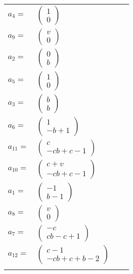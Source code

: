 \documentclass[1p]{elsarticle_modified}
\theoremstyle{definition}
\begin{document}
\begin{tabular}{m{7pt} m{180pt} m{7pt} m{180pt} }
\flushright $a_{4}=$&$\begin{pmatrix}1\\0\end{pmatrix}$ \\
\flushright $a_{9}=$&$\begin{pmatrix}v\\0\end{pmatrix}$ \\
\flushright $a_{2}=$&$\begin{pmatrix}0\\b\end{pmatrix}$ \\
\flushright $a_{5}=$&$\begin{pmatrix}1\\0\end{pmatrix}$ \\
\flushright $a_{3}=$&$\begin{pmatrix}b\\b\end{pmatrix}$ \\
\flushright $a_{6}=$&$\begin{pmatrix}1\\- b+1\end{pmatrix}$ \\
\flushright $a_{11}=$&$\begin{pmatrix}c\\- c b+c-1\end{pmatrix}$ \\
\flushright $a_{10}=$&$\begin{pmatrix}c+v\\- c b+c-1\end{pmatrix}$ \\
\flushright $a_{1}=$&$\begin{pmatrix}-1\\b-1\end{pmatrix}$ \\
\flushright $a_{8}=$&$\begin{pmatrix}v\\0\end{pmatrix}$ \\
\flushright $a_{7}=$&$\begin{pmatrix}- c\\c b- c+1\end{pmatrix}$ \\
\flushright $a_{12}=$&$\begin{pmatrix}c-1\\- c b+c+b-2\end{pmatrix}$\\&\end{tabular}
\end{document}
